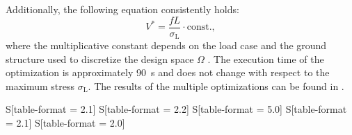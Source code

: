 Additionally, the following equation consistently holds:
\begin{equation} \label{eq:03_V_star}
    V^*=\frac{fL}{\sigma_\text{L}}\cdot \text{const.},
\end{equation}
where the multiplicative constant depends on the load case and the ground structure used to discretize the design space $\Omega$ . The execution time of the optimization is approximately \qty{90}{\second} and does not change with respect to the maximum stress $\sigma_\text{L}$. The results of the multiple optimizations can be found in .

\begin{table}
    \small
    \centering
    \begin{tabular}{S[table-format = 2.1]
                    S[table-format = 2.2]
                    S[table-format = 5.0]
                    S[table-format = 2.1]                    
                    S[table-format = 2.0]}
        

\end{tabular}
\end{table}
